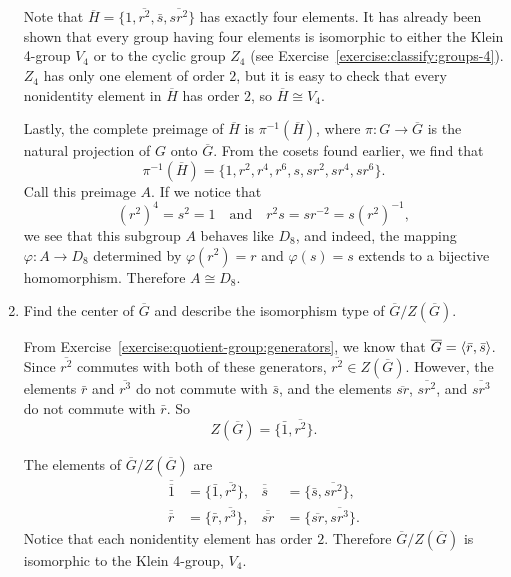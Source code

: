 \begin{enumerate}
\begin{solution}
    Note that
    $\overline{H} = \{1, \overline{r^2}, \bar{s}, \overline{sr^2}\}$
    has exactly four elements. It has already been shown that every
    group having four elements is isomorphic to either the Klein
    4-group $V_4$ or to the cyclic group $Z_4$ (see
    Exercise~\ref{exercise:classify:groups-4}). $Z_4$ has only one
    element of order $2$, but it is easy to check that every
    nonidentity element in $\overline{H}$ has order $2$, so
    $\overline{H}\cong V_4$.

    Lastly, the complete preimage of $\overline{H}$ is
    $\pi^{-1}(\overline{H})$, where $\pi\colon G\to\overline{G}$ is
    the natural projection of $G$ onto $\overline{G}$. From the cosets
    found earlier, we find that
    \begin{equation*}
      \pi^{-1}(\overline{H})
      = \{1, r^2, r^4, r^6, s, sr^2, sr^4, sr^6\}.
    \end{equation*}
    Call this preimage $A$. If we notice that
    \begin{equation*}
      (r^2)^4 = s^2 = 1
      \quad\text{and}\quad
      r^2s = sr^{-2} = s(r^2)^{-1},
    \end{equation*}
    we see that this subgroup $A$ behaves like $D_8$, and indeed, the
    mapping $\varphi\colon A\to D_8$ determined by $\varphi(r^2) = r$
    and $\varphi(s) = s$ extends to a bijective
    homomorphism. Therefore $A\cong D_8$.
  \end{solution}
\item Find the center of $\overline{G}$ and describe the isomorphism
  type of $\overline{G}/Z(\overline{G})$.
  \begin{solution}
    From Exercise~\ref{exercise:quotient-group:generators}, we know
    that $\overline{G} = \langle{\bar{r}, \bar{s}}\rangle$. Since
    $\overline{r^2}$ commutes with both of these generators,
    $\overline{r^2}\in Z(\overline{G})$. However, the elements
    $\bar{r}$ and $\overline{r^3}$ do not commute with $\bar{s}$, and
    the elements $\overline{sr}$, $\overline{sr^2}$, and
    $\overline{sr^3}$ do not commute with $\bar{r}$. So
    \begin{equation*}
      Z(\overline{G}) = \{ \bar1, \overline{r^2} \}.
    \end{equation*}

    The elements of $\overline{G}/Z(\overline{G})$ are
    \begin{align*}
      \overline{\overline1}
      &= \{\bar1, \overline{r^2}\},
      & \overline{\overline{s}}
      &= \{\bar{s}, \overline{sr^2}\}, \\
      \overline{\overline{r}}
      &= \{\bar{r}, \overline{r^3}\},
      & \overline{\overline{sr}}
      &= \{\overline{sr}, \overline{sr^3}\}.
    \end{align*}
    Notice that each nonidentity element has order $2$. Therefore
    $\overline{G}/Z(\overline{G})$ is isomorphic to the Klein 4-group,
    $V_4$.
  \end{solution}
\end{enumerate}

